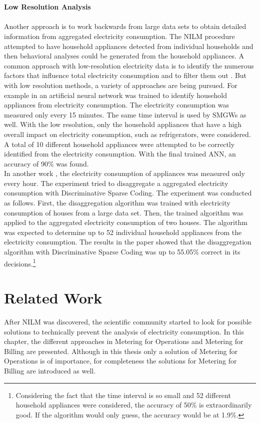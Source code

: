 \\
\\
\textbf{Low Resolution Analysis}
\label{subsec:low_reso}
\\
\\Another approach is to work backwards from large data sets to obtain detailed information from aggregated electricity consumption. The \gls{NILM} procedure attempted to have household appliances detected from individual households and then behavioral analyses could be generated from the household appliances. A common approach with low-resolution electricity data is to identify the numerous factors that influence total electricity consumption and to filter them out \cite{quinn2009privacy}.
But with low resolution methods, a variety of approaches are being pursued.
For example in \cite{prudenzi2002neuron} an artificial neural network was trained to identify household appliances from electricity consumption. The electricity consumption was measured only every 15 minutes. The same time interval is used by \gls{SMGW}s as well. With the low resolution, only the household appliances that have a high overall impact on electricity consumption, such as refrigerators, were considered. A total of 10 different household appliances were attempted to be correctly identified from the electricity consumption. With the final trained ANN, an accuracy of 90\% was found.
\\%
In another work \cite{kolter2010energy}, the electricity consumption of appliances was measured only every hour. The experiment tried to disaggregate a aggregated electricity consumption with Discriminative Sparse Coding. The experiment was conducted as follows. First, the disaggregation algorithm was trained with electricity consumption of houses from a large data set. Then, the trained algorithm was applied to the aggregated electricity consumption of two houses. The algorithm was expected to determine up to 52 individual household appliances from the electricity consumption. The results in the paper showed that the disaggregation algorithm with Discriminative Sparse Coding was up to 55.05\% correct in its decisions.\footnote[2]{Considering the fact that the time interval is so small and 52 different household appliances were considered, the accuracy of 50\% is extraordinarily good. If the algorithm would only guess, the accuracy would be at 1.9\%.}

\section{Related Work}
After \gls{NILM} was discovered, the scientific community started to look for possible solutions to technically prevent the analysis of electricity consumption. In this chapter, the different approaches in Metering for Operations and Metering for Billing are presented. Although in this thesis only a solution of Metering for Operations is of importance, for completeness the solutions for Metering for Billing are introduced as well.
